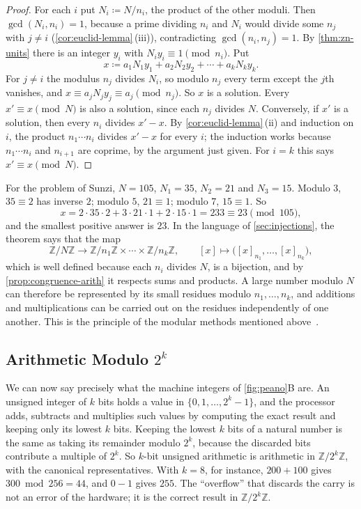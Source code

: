 \begin{proof}
For each $i$ put $N_i\coloneqq N/n_i$, the product of the other moduli. Then $\gcd(N_i,n_i)=1$, because a prime dividing $n_i$ and $N_i$ would divide some $n_j$ with $j\ne i$ (\cref{cor:euclid-lemma}\,(iii)), contradicting $\gcd(n_i,n_j)=1$. By \cref{thm:zn-units} there is an integer $y_i$ with $N_iy_i\equiv1\pmod{n_i}$. Put
\[
x\coloneqq a_1N_1y_1+a_2N_2y_2+\cdots+a_kN_ky_k .
\]
For $j\ne i$ the modulus $n_j$ divides $N_i$, so modulo $n_j$ every term except the $j$th vanishes, and $x\equiv a_jN_jy_j\equiv a_j\pmod{n_j}$. So $x$ is a solution. Every $x'\equiv x\pmod N$ is also a solution, since each $n_j$ divides $N$. Conversely, if $x'$ is a solution, then every $n_i$ divides $x'-x$. By \cref{cor:euclid-lemma}\,(ii) and induction on $i$, the product $n_1\cdots n_i$ divides $x'-x$ for every $i$; the induction works because $n_1\cdots n_i$ and $n_{i+1}$ are coprime, by the argument just given. For $i=k$ this says $x'\equiv x\pmod N$.
\end{proof}

For the problem of Sunzi, $N=105$, $N_1=35$, $N_2=21$ and $N_3=15$. Modulo $3$, $35\equiv2$ has inverse $2$; modulo $5$, $21\equiv1$; modulo $7$, $15\equiv1$. So
\[
x=2\cdot35\cdot2+3\cdot21\cdot1+2\cdot15\cdot1=233\equiv23\pmod{105},
\]
and the smallest positive answer is $23$. In the language of \cref{sec:injections}, the theorem says that the map
\[
\mathbb Z/N\mathbb Z\to\mathbb Z/n_1\mathbb Z\times\cdots\times\mathbb Z/n_k\mathbb Z,\qquad[x]\mapsto\bigl([x]_{n_1},\ldots,[x]_{n_k}\bigr),
\]
which is well defined because each $n_i$ divides $N$, is a bijection, and by \cref{prop:congruence-arith} it respects sums and products. A large number modulo $N$ can therefore be represented by its small residues modulo $n_1,\ldots,n_k$, and additions and multiplications can be carried out on the residues independently of one another. This is the principle of the modular methods mentioned above~\cite[Sect.~4.3.2]{knuth1997taocp2}.

\subsection{Arithmetic Modulo $2^k$}

We can now say precisely what the machine integers of \cref{fig:peano}B are. An unsigned integer of $k$ bits holds a value in $\{0,1,\ldots,2^k-1\}$, and the processor adds, subtracts and multiplies such values by computing the exact result and keeping only its lowest $k$ bits. Keeping the lowest $k$ bits of a natural number is the same as taking its remainder modulo $2^k$, because the discarded bits contribute a multiple of $2^k$. So $k$-bit unsigned arithmetic is arithmetic in $\mathbb Z/2^k\mathbb Z$, with the canonical representatives. With $k=8$, for instance, $200+100$ gives $300\bmod256=44$, and $0-1$ gives $255$. The ``overflow'' that discards the carry is not an error of the hardware; it is the correct result in $\mathbb Z/2^k\mathbb Z$.

